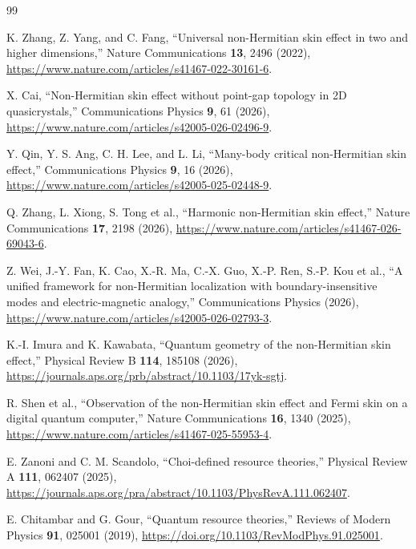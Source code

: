 \documentclass[11pt]{article}
\begin{document}
\begin{thebibliography}{99}

K. Zhang, Z. Yang, and C. Fang,
\newblock ``Universal non-Hermitian skin effect in two and higher dimensions,''
\newblock Nature Communications \textbf{13}, 2496 (2022),
\newblock \url{https://www.nature.com/articles/s41467-022-30161-6}.

X. Cai,
\newblock ``Non-Hermitian skin effect without point-gap topology in 2D quasicrystals,''
\newblock Communications Physics \textbf{9}, 61 (2026),
\newblock \url{https://www.nature.com/articles/s42005-026-02496-9}.

Y. Qin, Y. S. Ang, C. H. Lee, and L. Li,
\newblock ``Many-body critical non-Hermitian skin effect,''
\newblock Communications Physics \textbf{9}, 16 (2026),
\newblock \url{https://www.nature.com/articles/s42005-025-02448-9}.

Q. Zhang, L. Xiong, S. Tong et al.,
\newblock ``Harmonic non-Hermitian skin effect,''
\newblock Nature Communications \textbf{17}, 2198 (2026),
\newblock \url{https://www.nature.com/articles/s41467-026-69043-6}.

Z. Wei, J.-Y. Fan, K. Cao, X.-R. Ma, C.-X. Guo, X.-P. Ren, S.-P. Kou et al.,
\newblock ``A unified framework for non-Hermitian localization with boundary-insensitive modes and electric-magnetic analogy,''
\newblock Communications Physics (2026),
\newblock \url{https://www.nature.com/articles/s42005-026-02793-3}.

K.-I. Imura and K. Kawabata,
\newblock ``Quantum geometry of the non-Hermitian skin effect,''
\newblock Physical Review B \textbf{114}, 185108 (2026),
\newblock \url{https://journals.aps.org/prb/abstract/10.1103/17yk-sgtj}.

R. Shen et al.,
\newblock ``Observation of the non-Hermitian skin effect and Fermi skin on a digital quantum computer,''
\newblock Nature Communications \textbf{16}, 1340 (2025),
\newblock \url{https://www.nature.com/articles/s41467-025-55953-4}.

E. Zanoni and C. M. Scandolo,
\newblock ``Choi-defined resource theories,''
\newblock Physical Review A \textbf{111}, 062407 (2025),
\newblock \url{https://journals.aps.org/pra/abstract/10.1103/PhysRevA.111.062407}.

E. Chitambar and G. Gour,
\newblock ``Quantum resource theories,''
\newblock Reviews of Modern Physics \textbf{91}, 025001 (2019),
\newblock \url{https://doi.org/10.1103/RevModPhys.91.025001}.

\end{thebibliography}
\end{document}
